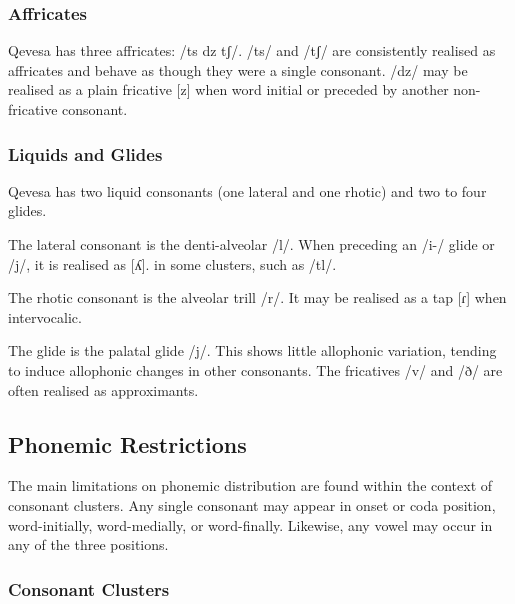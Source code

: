 \documentclass[grammar]{subfiles}
\begin{document}
  \subsubsection{Affricates}
  \label{sssec:affricates}

  Qevesa has three affricates: /ts dz tʃ/. /ts/ and /tʃ/ are consistently
  realised as affricates and behave as though they were a single consonant.
  /dz/ may be realised as a plain fricative [z] when word initial or preceded
  by another non-fricative consonant.


  \subsubsection{Liquids and Glides}
  \label{sssec:liquids}

  Qevesa has two liquid consonants (one lateral and one rhotic) and two to four glides.

  The lateral consonant is the denti-alveolar /l/. When preceding an /i-/ glide
  or /j/, it is realised as [ʎ].  %
  in some clusters, such as /tl/.

  The rhotic consonant is the alveolar trill /r/.  It may be realised as a tap
  [ɾ] when intervocalic.  

  The glide is the palatal glide /j/.  This shows little allophonic variation,
  tending to induce allophonic changes in other consonants.  The fricatives /v/
  and /ð/ are often realised as approximants.  

  \subsection{Phonemic Restrictions}
  \label{ssec:phonemic_restrictions}

  The main limitations on phonemic distribution are found within the context of
  consonant clusters.  Any single consonant may appear in onset or coda
  position, word-initially, word-medially, or word-finally.  Likewise, any
  vowel may occur in any of the three positions. 

  \subsubsection{Consonant Clusters}
  \label{sssec:consonant_clusters}
\end{document}
